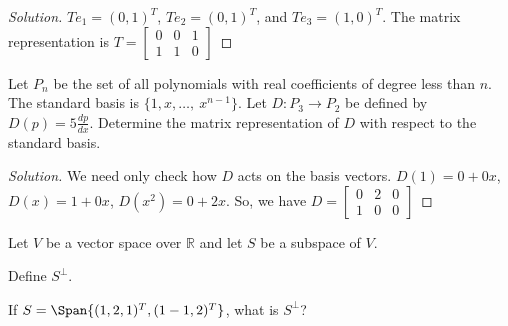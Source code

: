     \begin{proof}[Solution]
    $Te_1 = (0,1)^T$, $T e_2 = (0,1)^T$, and $Te_3 = (1,0)^T$. The matrix representation is $T=\begin{bmatrix} 0 & 0 & 1 \\ 1 & 1 & 0 \end{bmatrix}$
    \end{proof}
    \begin{problem}
    Let $P_n$ be the set of all polynomials with real coefficients of degree less than $n$. The standard basis is $\{1,x,\hdots, \ x^{n-1}\}$. Let $D:P_3 \rightarrow P_2$ be defined by $D(p) = 5\frac{dp}{dx}$. Determine the matrix representation of $D$ with respect to the standard basis.
    \end{problem}
    \begin{proof}[Solution]
    We need only check how $D$ acts on the basis vectors. $D(1) = 0+0x$, $D(x) = 1+0x$, $D(x^2) = 0+2x$. So, we have $D = \begin{bmatrix} 0 & 2 & 0 \\ 1 & 0 & 0 \end{bmatrix}$
    \end{proof}
    \begin{problem}
    Let $V$ be a vector space over $\mathbb{R}$ and let $S$ be a subspace of $V$.
    \begin{enumerate}
    \begin{multicols}{2}
        \item Define $S^{\perp}$.
        \item If $S=\Span\{ (1,2,1)^T, (1-1,2)^T\}$, what is $S^{\perp}$?
    \end{multicols}
    \end{enumerate}
    \end{problem}
